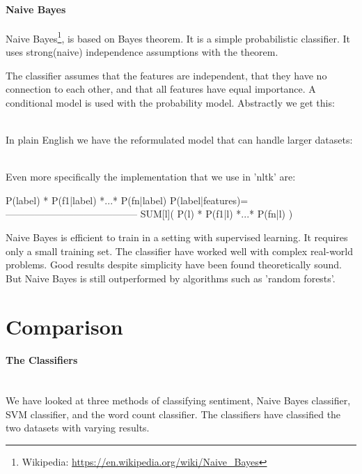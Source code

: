 \paragraph{Naive Bayes}\label{sentiment:naive_bayes_classification}
Naive Bayes\footnote{Wikipedia:
\url{https://en.wikipedia.org/wiki/Naive_Bayes}}, is based on Bayes theorem. It
is a simple probabilistic classifier. It uses strong(naive) independence
assumptions with the theorem.

The classifier assumes that the features are independent, that they have no
connection to each other, and that all features have equal importance. 
A conditional model is used with the probability model. Abstractly we get
this: 

\\

In plain English we have the reformulated model that can handle larger datasets:

\\

Even more specifically the implementation that we use in 'nltk' are: 
\begin{python}
                   P(label) * P(f1|label) *...* P(fn|label)
P(label|features)=-----------------------------------------
                   SUM[l]( P(l) * P(f1|l) *...* P(fn|l) )
\end{python}

Naive Bayes is efficient to train in a setting with supervised
learning. It requires only a small training set. The classifier have worked well
with complex real-world problems. Good results despite simplicity have been
found theoretically sound. But Naive Bayes is still outperformed by algorithms
such as 'random forests'.
%

\section{Comparison}\label{sentiment:comparison_results}
\paragraph{The Classifiers}
\hspace{0pt}\\
We have looked at three methods of classifying sentiment, Naive Bayes classifier, SVM
classifier, and the word count classifier.
The classifiers have classified the two datasets with varying results. 

